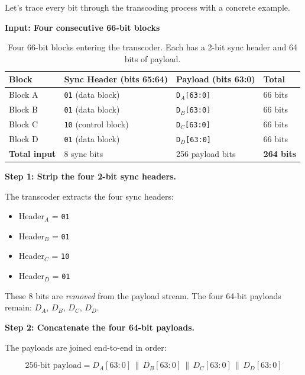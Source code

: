 \documentclass[openany]{tufte-book}
\begin{document}
Let's trace every bit through the transcoding process with a concrete example.

\textbf{Input: Four consecutive 66-bit blocks}

\begin{fullwidth}
\begin{table}
\centering
\small
\begin{tabular}{llll}
\toprule
\textbf{Block} & \textbf{Sync Header (bits 65:64)} & \textbf{Payload (bits 63:0)} & \textbf{Total} \\
\midrule
Block A & \texttt{01} (data block) & \texttt{D$_A$[63:0]} & 66 bits \\
Block B & \texttt{01} (data block) & \texttt{D$_B$[63:0]} & 66 bits \\
Block C & \texttt{10} (control block) & \texttt{D$_C$[63:0]} & 66 bits \\
Block D & \texttt{01} (data block) & \texttt{D$_D$[63:0]} & 66 bits \\
\midrule
\textbf{Total input} & 8 sync bits & 256 payload bits & \textbf{264 bits} \\
\bottomrule
\end{tabular}
\caption{Four 66-bit blocks entering the transcoder. Each has a 2-bit sync
header and 64 bits of payload.}
\end{table}
\end{fullwidth}

\textbf{Step 1: Strip the four 2-bit sync headers.}

The transcoder extracts the four sync headers:
\begin{itemize}
\item Header$_A$ = \texttt{01}
\item Header$_B$ = \texttt{01}
\item Header$_C$ = \texttt{10}
\item Header$_D$ = \texttt{01}
\end{itemize}

These 8 bits are \textit{removed} from the payload stream. The four 64-bit
payloads remain: $D_A$, $D_B$, $D_C$, $D_D$.

\textbf{Step 2: Concatenate the four 64-bit payloads.}

The payloads are joined end-to-end in order:

\begin{equation}
\text{256-bit payload} = D_A[63:0] \,\|\, D_B[63:0] \,\|\, D_C[63:0] \,\|\, D_D[63:0]
\end{equation}
\end{document}

